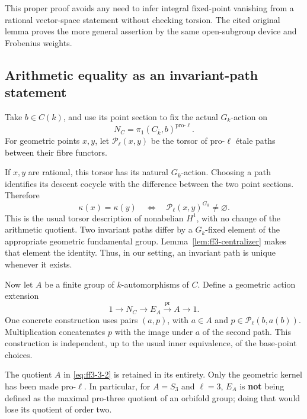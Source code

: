 This proper proof avoids any need to infer integral fixed-point vanishing from a rational vector-space statement without checking torsion. The cited original lemma proves the more general assertion by the same open-subgroup device and Frobenius weights.

\subsection{Arithmetic equality as an invariant-path statement}
\label{subsec:ff3-paths}

Take \(b\in C(k)\), and use its point section to fix the actual \(G_k\)-action on \[
 N_C=\pi_1(C_{\bar k},b)^{\mathrm{pro}\text{-}\ell}.
\] For geometric points \(x,y\), let \(\mathcal P_\ell(x,y)\) be the torsor of pro-\(\ell\) étale paths between their fibre functors.

If \(x,y\) are rational, this torsor has its natural \(G_k\)-action. Choosing a path identifies its descent cocycle with the difference between the two point sections. Therefore \begin{equation}
\kappa(x)=\kappa(y)
 \quad\Longleftrightarrow\quad
 \mathcal P_\ell(x,y)^{G_k}\ne\varnothing.
\label{eq:ff3-3-1}
\end{equation} This is the usual torsor description of nonabelian \(H^1\), with no change of the arithmetic quotient. Two invariant paths differ by a \(G_k\)-fixed element of the appropriate geometric fundamental group. Lemma~\ref{lem:ff3-centralizer} makes that element the identity. Thus, in our setting, an invariant path is unique whenever it exists.

Now let \(A\) be a finite group of \(k\)-automorphisms of \(C\). Define a geometric action extension \begin{equation}
1\longrightarrow N_C\longrightarrow E_A
 \overset{\mathrm{pr}}\longrightarrow A\longrightarrow1.
\label{eq:ff3-3-2}
\end{equation} One concrete construction uses pairs \((a,p)\), with \(a\in A\) and \(p\in\mathcal P_\ell(b,a(b))\). Multiplication concatenates \(p\) with the image under \(a\) of the second path. This construction is independent, up to the usual inner equivalence, of the base-point choices.

The quotient \(A\) in \eqref{eq:ff3-3-2} is retained in its entirety. Only the geometric kernel has been made pro-\(\ell\). In particular, for \(A=S_3\) and \(\ell=3\), \(E_A\) is \textbf{not} being defined as the maximal pro-three quotient of an orbifold group; doing that would lose its quotient of order two.

